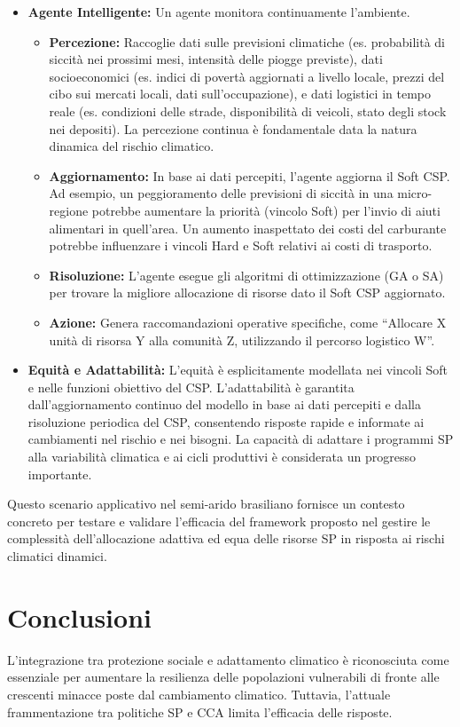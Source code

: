 \documentclass{article}
\begin{document}
\begin{itemize}
    \item \textbf{Agente Intelligente:} Un agente monitora continuamente l'ambiente.
    \begin{itemize}
        \item \textbf{Percezione:} Raccoglie dati sulle previsioni climatiche (es. probabilità di siccità nei prossimi mesi, intensità delle piogge previste), dati socioeconomici (es. indici di povertà aggiornati a livello locale, prezzi del cibo sui mercati locali, dati sull'occupazione), e dati logistici in tempo reale (es. condizioni delle strade, disponibilità di veicoli, stato degli stock nei depositi). La percezione continua è fondamentale data la natura dinamica del rischio climatico.
        \item \textbf{Aggiornamento:} In base ai dati percepiti, l'agente aggiorna il Soft CSP. Ad esempio, un peggioramento delle previsioni di siccità in una micro-regione potrebbe aumentare la priorità (vincolo Soft) per l'invio di aiuti alimentari in quell'area. Un aumento inaspettato dei costi del carburante potrebbe influenzare i vincoli Hard e Soft relativi ai costi di trasporto.
        \item \textbf{Risoluzione:} L'agente esegue gli algoritmi di ottimizzazione (GA o SA) per trovare la migliore allocazione di risorse dato il Soft CSP aggiornato.
        \item \textbf{Azione:} Genera raccomandazioni operative specifiche, come ``Allocare X unità di risorsa Y alla comunità Z, utilizzando il percorso logistico W''.
    \end{itemize}
    
    \item \textbf{Equità e Adattabilità:} L'equità è esplicitamente modellata nei vincoli Soft e nelle funzioni obiettivo del CSP. L'adattabilità è garantita dall'aggiornamento continuo del modello in base ai dati percepiti e dalla risoluzione periodica del CSP, consentendo risposte rapide e informate ai cambiamenti nel rischio e nei bisogni. La capacità di adattare i programmi SP alla variabilità climatica e ai cicli produttivi è considerata un progresso importante.
\end{itemize}

Questo scenario applicativo nel semi-arido brasiliano fornisce un contesto concreto per testare e validare l'efficacia del framework proposto nel gestire le complessità dell'allocazione adattiva ed equa delle risorse SP in risposta ai rischi climatici dinamici.

\section{Conclusioni}
L'integrazione tra protezione sociale e adattamento climatico è riconosciuta come essenziale per aumentare la resilienza delle popolazioni vulnerabili di fronte alle crescenti minacce poste dal cambiamento climatico. Tuttavia, l'attuale frammentazione tra politiche SP e CCA limita l'efficacia delle risposte.
\end{document}

